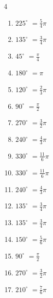 \begin{multicols}{4}
\begin{enumerate}
  \item $\displaystyle 225^{\circ}$
        $\displaystyle =\frac{5}{4}\pi$

  \item $\displaystyle 135^{\circ}$
        $\displaystyle =\frac{3}{4}\pi$

  \item $\displaystyle 45^{\circ}$
        $\displaystyle =\frac{\pi}{4}$

  \item $\displaystyle 180^{\circ}$
        $\displaystyle =\pi$

  \item $\displaystyle 120^{\circ}$
        $\displaystyle =\frac{2}{3}\pi$

  \item $\displaystyle 90^{\circ}$
        $\displaystyle =\frac{\pi}{2}$

  \item $\displaystyle 270^{\circ}$
        $\displaystyle =\frac{3}{2}\pi$

  \item $\displaystyle 240^{\circ}$
        $\displaystyle =\frac{4}{3}\pi$

  \item $\displaystyle 330^{\circ}$
        $\displaystyle =\frac{11}{6}\pi$

  \item $\displaystyle 330^{\circ}$
        $\displaystyle =\frac{11}{6}\pi$

  \item $\displaystyle 240^{\circ}$
        $\displaystyle =\frac{4}{3}\pi$

  \item $\displaystyle 135^{\circ}$
        $\displaystyle =\frac{3}{4}\pi$

  \item $\displaystyle 135^{\circ}$
        $\displaystyle =\frac{3}{4}\pi$

  \item $\displaystyle 150^{\circ}$
        $\displaystyle =\frac{5}{6}\pi$

  \item $\displaystyle 90^{\circ}$
        $\displaystyle =\frac{\pi}{2}$

  \item $\displaystyle 270^{\circ}$
        $\displaystyle =\frac{3}{2}\pi$

  \item $\displaystyle 210^{\circ}$
        $\displaystyle =\frac{7}{6}\pi$


\end{enumerate}
\end{multicols}
